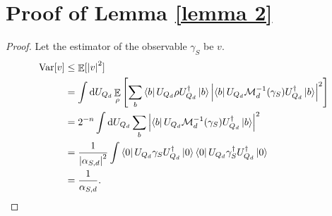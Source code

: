\documentclass{article}
\newcommand{\mean}{\mathop{\mathbb{E}}}
\newcommand{\Var}{\mathop{\mathrm{Var}}}
\begin{document}
\section{Proof of Lemma \ref{lemma 2}}
\begin{proof}
Let the estimator of the observable $\gamma_S$ be $v$.
\begin{align}
\Var[v] &\leq \mean[\abs{v}^2]\\
&= \int \dd U_{Q_d}
 \mean_{\rho}\left[\sum_b \bra{b}U_{Q_d} \rho U_{Q_d}^\dagger\ket{b} \abs{\bra{b}U_{Q_d} \mathcal{M}_d^{-1} (\gamma_S) U_{Q_d}^\dagger \ket{b}}^2\right]\\
 &=2^{-n}\int  \dd U_{Q_d} \sum_b \abs{\bra{b}U_{Q_d} \mathcal{M}_d^{-1} (\gamma_S) U_{Q_d}^\dagger\ket{b}}^2\\
 &=\frac{1}{\abs{\alpha_{S,d}}^2} \int \bra{0}U_{Q_d} \gamma_S U_{Q_d}^\dagger\ket{0}\bra{0}U_{Q_d} \gamma_S^\dagger U_{Q_d}^\dagger\ket{0}\\
 &=\frac{1}{\alpha_{S,d}}.
 \end{align}



\end{proof}
\end{document}
